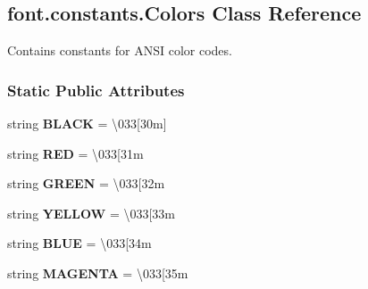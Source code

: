 \hypertarget{classfont_1_1constants_1_1Colors}{}\subsection{font.\+constants.\+Colors Class Reference}
\label{classfont_1_1constants_1_1Colors}


Contains constants for A\+N\+SI color codes.  


\subsubsection*{Static Public Attributes}
\begin{DoxyCompactItemize}
\item 
string {\bfseries B\+L\+A\+CK} = \textquotesingle{}\textbackslash{}033\mbox{[}30m\mbox{]}\textquotesingle{}\hypertarget{classfont_1_1constants_1_1Colors_afb0947d4badc4d61510141f299ae342f}{}\label{classfont_1_1constants_1_1Colors_afb0947d4badc4d61510141f299ae342f}

\item 
string {\bfseries R\+ED} = \textquotesingle{}\textbackslash{}033\mbox{[}31m\textquotesingle{}\hypertarget{classfont_1_1constants_1_1Colors_ab71c856d5c4608461c28c583dd7801b6}{}\label{classfont_1_1constants_1_1Colors_ab71c856d5c4608461c28c583dd7801b6}

\item 
string {\bfseries G\+R\+E\+EN} = \textquotesingle{}\textbackslash{}033\mbox{[}32m\textquotesingle{}\hypertarget{classfont_1_1constants_1_1Colors_a36b2a63f5603bddc4b00def85db005b6}{}\label{classfont_1_1constants_1_1Colors_a36b2a63f5603bddc4b00def85db005b6}

\item 
string {\bfseries Y\+E\+L\+L\+OW} = \textquotesingle{}\textbackslash{}033\mbox{[}33m\textquotesingle{}\hypertarget{classfont_1_1constants_1_1Colors_a7325d06cee4dc3a6097bf584d7a0c086}{}\label{classfont_1_1constants_1_1Colors_a7325d06cee4dc3a6097bf584d7a0c086}

\item 
string {\bfseries B\+L\+UE} = \textquotesingle{}\textbackslash{}033\mbox{[}34m\textquotesingle{}\hypertarget{classfont_1_1constants_1_1Colors_a46ce2e0fc3e5c40075cae590eaf85293}{}\label{classfont_1_1constants_1_1Colors_a46ce2e0fc3e5c40075cae590eaf85293}

\item 
string {\bfseries M\+A\+G\+E\+N\+TA} = \textquotesingle{}\textbackslash{}033\mbox{[}35m\textquotesingle{}\hypertarget{classfont_1_1constants_1_1Colors_a8fa42a6991d5157672c51a9b953279c6}{}\label{classfont_1_1constants_1_1Colors_a8fa42a6991d5157672c51a9b953279c6}


\end{DoxyCompactItemize}
